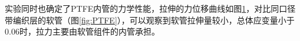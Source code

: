 实验同时也确定了PTFE内管的力学性能，拉伸的力位移曲线如图\ref{fig:PTFE-traction}，对比同口径带编织层的软管（图\ref{fig:PTFE}），可以观察到软管拉伸量较小，总体应变量小于0.06时，拉力主要由软管组件的内管承担。
\begin{figure}[!htb]
\centering
{}
\hspace{0.5cm}
\label{fig:PTFE-traction}
\end{figure}






